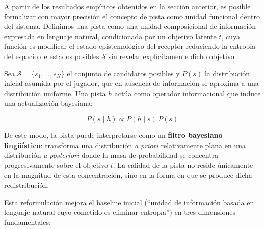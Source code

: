 \documentclass[../main.tex]{subfiles}
\begin{document}
A partir de los resultados empíricos obtenidos en la sección anterior, es posible formalizar con mayor precisión el concepto de pista como unidad funcional dentro del sistema. Definimos una pista como una unidad composicional de información expresada en lenguaje natural, condicionada por un objetivo latente $t$, cuya función es modificar el estado epistemológico del receptor reduciendo la entropía del espacio de estados posibles $\mathcal{S}$ sin revelar explícitamente dicho objetivo.

Sea $\mathcal{S} = \{s_1, \dots, s_N\}$ el conjunto de candidatos posibles y $P(s)$ la distribución inicial asumida por el jugador, que en ausencia de información se aproxima a una distribución uniforme. Una pista $h$ actúa como operador informacional que induce una actualización bayesiana:

\[
P(s \mid h) \propto P(h \mid s)\,P(s)
\]

De este modo, la pista puede interpretarse como un \textbf{filtro bayesiano lingüístico}: transforma una distribución \textit{a priori} relativamente plana en una distribución \textit{a posteriori} donde la masa de probabilidad se concentra progresivamente sobre el objetivo $t$. La calidad de la pista no reside únicamente en la magnitud de esta concentración, sino en la forma en que se produce dicha redistribución.

Esta reformulación mejora el baseline inicial (``unidad de información basada en lenguaje natural cuyo cometido es eliminar entropía'') en tres dimensiones fundamentales:
\end{document}
